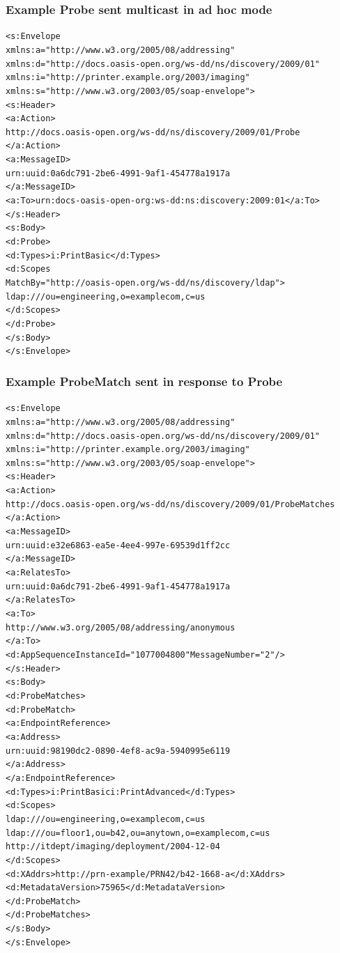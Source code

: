 \documentclass{note}
\begin{document}
\subsubsection{Example Probe sent multicast in ad hoc mode}
\begin{alltt}
<s:Envelope
   xmlns:a="http://www.w3.org/2005/08/addressing"
   xmlns:d="http://docs.oasis-open.org/ws-dd/ns/discovery/2009/01"
   xmlns:i="http://printer.example.org/2003/imaging"
   xmlns:s="http://www.w3.org/2003/05/soap-envelope" >
   <s:Header>
      <a:Action>
         http://docs.oasis-open.org/ws-dd/ns/discovery/2009/01/Probe
      </a:Action>
      <a:MessageID>
         urn:uuid:0a6dc791-2be6-4991-9af1-454778a1917a
      </a:MessageID>
      <a:To>urn:docs-oasis-open-org:ws-dd:ns:discovery:2009:01</a:To>
   </s:Header>
   <s:Body>
      <d:Probe>
         <d:Types>i:PrintBasic</d:Types>
         <d:Scopes
            MatchBy="http://oasis-open.org/ws-dd/ns/discovery/ldap" >
            ldap:///ou=engineering,o=examplecom,c=us
         </d:Scopes>
      </d:Probe>
   </s:Body>
</s:Envelope>
\end{alltt}
\subsubsection{Example ProbeMatch sent in response to Probe}
\begin{alltt}
<s:Envelope
  xmlns:a="http://www.w3.org/2005/08/addressing"
  xmlns:d="http://docs.oasis-open.org/ws-dd/ns/discovery/2009/01"
  xmlns:i="http://printer.example.org/2003/imaging"
  xmlns:s="http://www.w3.org/2003/05/soap-envelope" >
  <s:Header>
    <a:Action>
      http://docs.oasis-open.org/ws-dd/ns/discovery/2009/01/ProbeMatches
    </a:Action>
    <a:MessageID>
      urn:uuid:e32e6863-ea5e-4ee4-997e-69539d1ff2cc
    </a:MessageID>
    <a:RelatesTo>
      urn:uuid:0a6dc791-2be6-4991-9af1-454778a1917a
    </a:RelatesTo>
    <a:To>
    http://www.w3.org/2005/08/addressing/anonymous
    </a:To>
    <d:AppSequence InstanceId="1077004800" MessageNumber="2" />
  </s:Header>
  <s:Body>
    <d:ProbeMatches>
      <d:ProbeMatch>
        <a:EndpointReference>
          <a:Address>
            urn:uuid:98190dc2-0890-4ef8-ac9a-5940995e6119
          </a:Address>
        </a:EndpointReference>
        <d:Types>i:PrintBasic i:PrintAdvanced</d:Types>
        <d:Scopes>
          ldap:///ou=engineering,o=examplecom,c=us
          ldap:///ou=floor1,ou=b42,ou=anytown,o=examplecom,c=us
          http://itdept/imaging/deployment/2004-12-04
        </d:Scopes>
        <d:XAddrs>http://prn-example/PRN42/b42-1668-a</d:XAddrs>
        <d:MetadataVersion>75965</d:MetadataVersion>
      </d:ProbeMatch>
    </d:ProbeMatches>
  </s:Body>
</s:Envelope>
\end{alltt}
\end{document}
